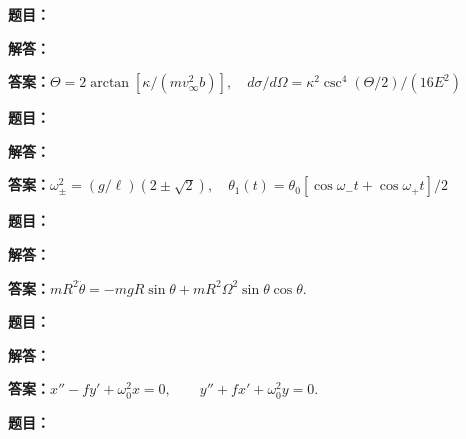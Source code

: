 \documentclass[lang=cn,color=blue,11pt]{elegantbook}
\begin{document}
\noindent\textbf{题目：}
\par\noindent\textbf{解答：}
\par\noindent\textbf{答案：}\(\displaystyle \Theta=2\arctan[\kappa/(mv_\infty^2b)],\quad d\sigma/d\Omega=\kappa^2\csc^4(\Theta/2)/(16E^2)\)\par
\par\smallskip\noindent\hrulefill\par\medskip
{}\par
\noindent\textbf{题目：}
\par\noindent\textbf{解答：}
\par\noindent\textbf{答案：}\(\displaystyle \omega_\pm^2=(g/\ell)(2\pm\sqrt2),\quad\theta_1(t)=\theta_0[\cos\omega_-t+\cos\omega_+t]/2\)\par
\par\smallskip\noindent\hrulefill\par\medskip
{}\par
\noindent\textbf{题目：}
\par\noindent\textbf{解答：}
\par\noindent\textbf{答案：}\(\displaystyle 
mR^2\ddot\theta=-mgR\sin\theta+mR^2\Omega^2\sin\theta\cos\theta .
\)\par
\par\smallskip\noindent\hrulefill\par\medskip
{}\par
\noindent\textbf{题目：}
\par\noindent\textbf{解答：}
\par\noindent\textbf{答案：}\(\displaystyle 
x''-fy'+\omega_0^2x=0,\qquad
y''+fx'+\omega_0^2y=0.
\)\par
\par\smallskip\noindent\hrulefill\par\medskip
{}\par
\noindent\textbf{题目：}
\end{document}

